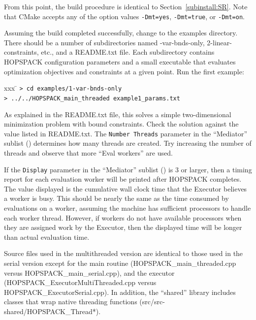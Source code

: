 From this point, the build procedure is identical to Section~\ref{subinstall:SR}.
Note that CMake accepts any of the option values {\tt -Dmt=yes}, {\tt -Dmt=true},
or {\tt -Dmt=on}.

Assuming the build completed successfully, change to the {\sf examples}
directory.  There should be a number of subdirectories named
{-var-bnds-only, 2-linear-constraints}, etc., and a {\sf README.txt} file.
Each subdirectory contains HOPSPACK configuration parameters and a small
executable that evaluates optimization objectives and constraints at a given
point.
Run the first example:
\vspace{-11pt}
\begin{tabbing}
  xxx \= \kill
  \> {\tt > cd examples/1-var-bnds-only} \\
  \> {\tt > ../../HOPSPACK\_main\_threaded example1\_params.txt}
\end{tabbing}
\vspace{-11pt}
As explained in the {\sf README.txt} file, this solves a simple two-dimensional
minimization problem with bound constraints.  Check the solution against
the value listed in {\sf README.txt}.
The {\tt Number Threads} parameter in the ``Mediator'' sublist
() determines how many threads are created.
Try increasing the number of threads and observe that more ``Eval workers''
are used.

If the {\tt Display} parameter in the ``Mediator'' sublist
() is 3 or larger,
then a timing report for each evaluation worker will be printed after
HOPSPACK completes.  The value displayed is the cumulative wall clock time that
the Executor believes a worker is busy.  This should be nearly the same as the
time consumed by evaluations on a worker, assuming the machine has sufficient
processors to handle each worker thread.  However, if workers do not have
available processors when they are assigned work by the Executor, then the
displayed time will be longer than actual evaluation time.

Source files used in the multithreaded version are identical to those used
in the serial version except for the main routine
({\sf HOPSPACK\_main\_threaded.cpp} versus {\sf HOPSPACK\_main\_serial.cpp}),
and the executor
({\sf HOPSPACK\_ExecutorMultiThreaded.cpp} versus
{\sf HOPSPACK\_ExecutorSerial.cpp}).
In addition, the ``shared'' library includes classes that wrap native
threading functions ({\sf src/src-shared/HOPSPACK\_Thread*}).


